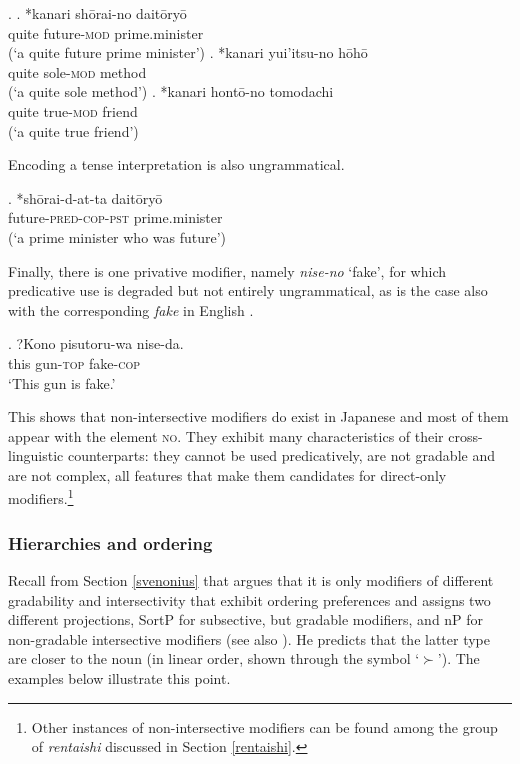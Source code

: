 \ex. \ag. *kanari shōrai-no daitōryō\\
quite future-\textsc{mod} prime.minister\\
(`a quite future prime minister’)
\bg. *kanari yui'itsu-no hōhō\\
quite sole-\textsc{mod} method\\
(`a quite sole method’)
\cg. *kanari hontō-no tomodachi\\
quite true-\textsc{mod} friend\\
(`a quite true friend’)

Encoding a tense interpretation is also ungrammatical.

\exg. *shōrai-d-at-ta daitōryō\\
future-\textsc{pred-cop-pst} prime.minister\\
(`a prime minister who was future’)

Finally, there is one privative modifier, namely \textit{nise-no} `fake’, for which predicative use is degraded but not entirely ungrammatical, as is the case also with the corresponding \textit{fake} in English \citep{cinque:2014:semantics}.

\exg. ?Kono pisutoru-wa nise-da.\\
this gun-\textsc{top} fake-\textsc{cop}\\
`This gun is fake.'

This shows that non-intersective modifiers do exist in Japanese and most of them appear with the element \textsc{no}. They exhibit many characteristics of their cross-linguistic counterparts: they cannot be used predicatively, are not gradable and are not complex, all features that make them candidates for direct-only modifiers.\footnote{Other instances of non-intersective modifiers can be found among the group of \textit{rentaishi} discussed in Section \ref{rentaishi}.}

\subsubsection{Hierarchies and ordering} \label{ordering intersective}

Recall from Section \ref{svenonius} that \citet{svenonius:2008:position} argues that it is only modifiers of different gradability and intersectivity that exhibit ordering preferences and assigns two different projections, SortP for subsective, but gradable modifiers, and nP for non-gradable intersective modifiers (see also \citealt{dekany:2011:profile, truswell:2009:attributive, kim:2019:syntax}). He predicts that the latter type are closer to the noun (in linear order, shown through the symbol `$\succ$'). The examples below illustrate this point.

